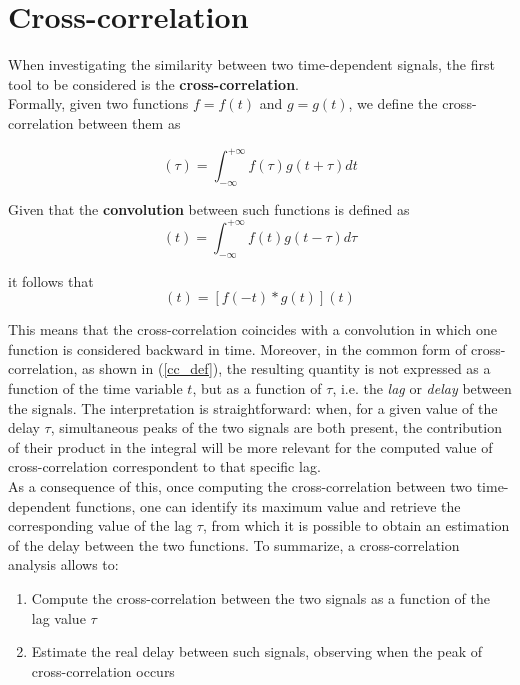 \documentclass[12pt, a4paper]{report}
\begin{document}
\section{Cross-correlation} \label{cc_section}

When investigating the similarity between two time-dependent signals, the first tool to be considered is the \textbf{cross-correlation}.\\
Formally, given two functions $ f = f(t)$ and $ g = g(t)$, we define the cross-correlation between them as

\begin{equation}
[f(t) \star g(t)] (\tau) = \int_{-\infty}^{+\infty} f(\tau)g(t+\tau) dt \label{cc_def}
\end{equation}


Given that the \textbf{convolution} between such functions is defined as 
\begin{equation}
[f(t) * g (t)](t) = \int_{-\infty}^{+\infty} f(t) g (t-\tau) d\tau
\end{equation}

it follows that
\begin{equation}
[f(t) \star g(t)](t) = [f(-t) * g (t)](t) 
\end{equation}

This means that the cross-correlation coincides with a convolution in which one function is considered backward in time. Moreover, in the common form of cross-correlation, as shown in (\ref{cc_def}), the resulting quantity is not expressed as a function of the time variable $t$, but as a function of $\tau$, i.e. the \textit{lag} or \textit{delay} between the signals. The interpretation is straightforward: when, for a given value of the delay $\tau$, simultaneous peaks of the two signals are both present, the contribution of their product in the integral will be more relevant for the computed value of cross-correlation correspondent to  that specific lag.\\
As a consequence of this, once computing the cross-correlation between two time-dependent functions, one can identify its maximum value and retrieve the corresponding value of the lag $\tau$, from which it is possible to obtain an estimation of the delay between the two functions. To summarize, a cross-correlation analysis allows to:
\begin{enumerate}
	\item Compute the cross-correlation between the two signals as a function of the lag value  $\tau$
	
	\item Estimate the real delay between such signals, observing when the peak of cross-correlation occurs
\end{enumerate}
\end{document}
